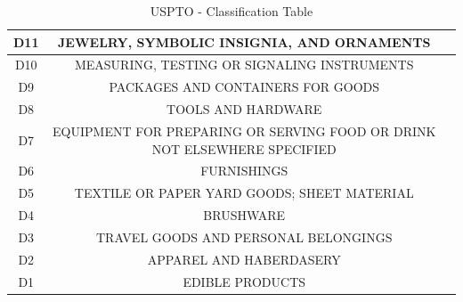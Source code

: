 \documentclass{sig-alternate}
\begin{document}
{\begin{table}
\begin{tabular}{|c|c|l|}
D11 & JEWELRY, SYMBOLIC INSIGNIA, AND ORNAMENTS\\ \hline
D10 & MEASURING, TESTING OR SIGNALING INSTRUMENTS\\ \hline
D9 & PACKAGES AND CONTAINERS FOR GOODS\\ \hline
D8& TOOLS AND HARDWARE \\ \hline
D7& EQUIPMENT FOR PREPARING OR SERVING FOOD OR DRINK NOT ELSEWHERE SPECIFIED \\ \hline
D6 & FURNISHINGS\\ \hline
D5 & TEXTILE OR PAPER YARD GOODS; SHEET MATERIAL\\ \hline
D4 & BRUSHWARE\\ \hline
D3 & TRAVEL GOODS AND PERSONAL BELONGINGS\\ \hline
D2 & APPAREL AND HABERDASERY\\ \hline
D1 & EDIBLE PRODUCTS\\ \hline
\end{tabular}
\centering
\caption{USPTO - Classification Table}
\end{table} 
 
}
\end{document}
